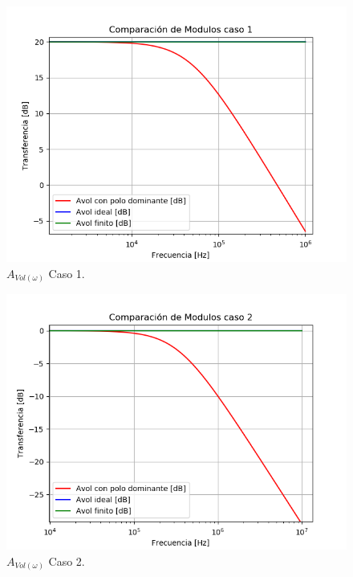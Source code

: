 \begin{figure}[H]	
	\centering
	\includegraphics[width=\textwidth]{Ejercicio1/Imagenes/HCompC1.png}
	\caption{$A_{Vol(\omega)}$ Caso 1.}
	\label{fig:AvolC1}
\end{figure}
\begin{figure}[H]	
	\centering
	\includegraphics[width=\textwidth]{Ejercicio1/Imagenes/HCompC2.png}
	\caption{$A_{Vol(\omega)}$ Caso 2.}
	\label{fig:AvolC2}
\end{figure}

